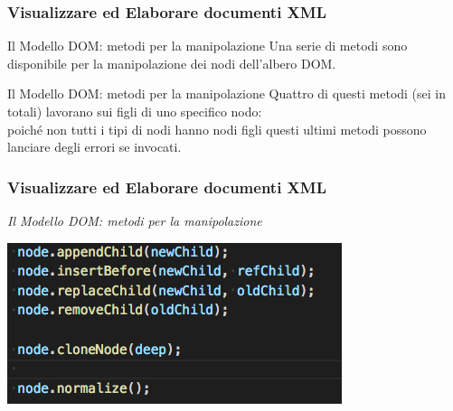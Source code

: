 \begin{frame}
    \frametitle{Visualizzare ed Elaborare documenti XML}
    \addtocounter{nframe}{1}
    

     \begin{block}{Il Modello DOM: metodi per la manipolazione}
        Una serie di metodi sono disponibile per la manipolazione dei nodi dell'albero DOM.
     \end{block}

     \begin{block}{Il Modello DOM: metodi per la manipolazione}
        Quattro di questi metodi (sei in totali) lavorano sui figli di uno specifico nodo:
        \\poiché non tutti i tipi di nodi hanno nodi figli questi ultimi metodi possono lanciare degli errori se invocati.
     \end{block}

\end{frame}

\begin{frame}
    \frametitle{Visualizzare ed Elaborare documenti XML}
    \addtocounter{nframe}{1}
    

     \textit{Il Modello DOM: metodi per la manipolazione}
       
    \begin{center}
        \includegraphics[width=.9\textwidth]{imgs/nodeManipulation.png}
    \end{center}
     
\end{frame}


